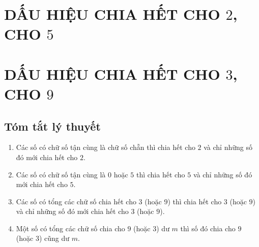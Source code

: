 \section{DẤU HIỆU CHIA HẾT CHO $2$, CHO $5$}
\section{DẤU HIỆU CHIA HẾT CHO $3$, CHO $9$}
\subsection{Tóm tắt lý thuyết}
\begin{enumerate}[1.]
\item  Các số có chữ số tận cùng là chữ số chẵn thì chia hết cho $2$ và chỉ những số đó mới chia hết cho $2$.
\item  Các số có chữ số tận cùng là $0$ hoặc $5$ thì chia hết cho $5$ và chỉ những số đó mới chia hết cho $5$.
\item Các số có tổng các chữ số chia hết cho $3$  (hoặc $9$) thì chia hết cho $3$ (hoặc $9$) và chỉ những số đó mới chia hết cho $3$ (hoặc $9$).
\item Một số có tổng các chữ số chia cho $9$ (hoặc $3$) dư $m$ thì số đó chia cho $9$ (hoặc $3$) cũng dư $m$.
\end{enumerate}
